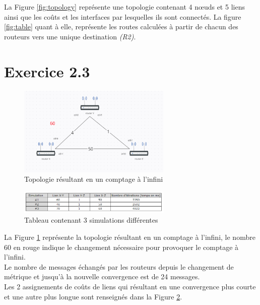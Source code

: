 \documentclass[11pt]{article}
\begin{document}
La Figure \ref{fig:topology} représente une topologie contenant 4 nœuds et 5 liens ainsi que les coûts et les interfaces par lesquelles ils sont connectés. La figure \ref{fig:table} quant à elle, représente les routes calculées à partir de chacun des routeurs vers une unique destination \textit{(R2)}.



\section{Exercice 2.3}
\begin{figure} [h!]
\centering
  \includegraphics[width=0.65\textwidth]{../documents/infinity-figure.png}
  \caption{Topologie résultant en un comptage à l'infini}
   \label{fig:inf-topo}
\end{figure}
\begin{figure} [h!]
\centering
  \includegraphics[width=0.65\textwidth]{../documents/infinity-table.png}
  \caption{Tableau contenant 3 simulations différentes}
   \label{fig:inf-table}
\end{figure}

La Figure \ref{fig:inf-topo} représente la topologie résultant en un comptage à l'infini, le nombre 60 en rouge indique le changement nécessaire pour provoquer le comptage à l'infini.\\

Le nombre de messages échangés par les routeurs depuis le changement de métrique et jusqu'à la nouvelle convergence est de 24 messages.\\

Les 2 assignements de coûts de liens qui résultant en une convergence plus courte et une autre plus longue sont renseignés dans la Figure \ref{fig:inf-table}.
\end{document}
